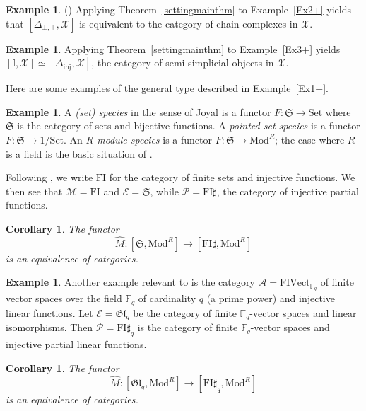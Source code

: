 \documentclass[a4paper,12pt,reqno]{amsart}
\newtheorem{corollary}[theorem]{Corollary}
\theoremstyle{definition}
\newtheorem{example}[theorem]{Example}
\theoremstyle{fact}
\theoremstyle{genquest}
\theoremstyle{step}
\newcommand{\lra}{\longrightarrow}
\def\CA{{\mathscr A}}
\def\CE{{\mathscr E}}
\def\CM{{\mathscr M}}
\def\CP{{\mathscr P}}
\def\CX{{\mathscr X}}
\begin{document}
\begin{example}\label{DPK} (\cite{Dold, DoldPuppe, Kan}) Applying Theorem~\ref{settingmainthm} to 
Example~\ref{Ex2+} yields that $[\Delta_{\bot,\top},\CX]$ is equivalent to 
the category of chain complexes in $\CX$.
\end{example}

\begin{example} 
Applying Theorem~\ref{settingmainthm} to Example~\ref{Ex3+} yields 
$[\mathbb{I},\CX] \simeq [\Delta_{\mathrm{inj}},\CX]$, the category of semi-simplicial objects in $\CX$.
\end{example}
\bigskip

Here are some examples of the general type described in Example~\ref{Ex1+}.
\bigskip

\begin{example} A {\em (set) species} in the sense of Joyal \cite{Species} is a functor 
$F : \mathfrak{S} \lra \mathrm{Set}$
where $\mathfrak{S}$ is the category of sets and bijective functions. 
A {\em pointed-set species} is a functor 
$F : \mathfrak{S} \lra 1/\mathrm{Set}$.
An {\em $R$-module species} is a functor 
$F : \mathfrak{S} \lra \mathrm{Mod}^R$; the case where $R$ is
a field is the basic situation of \cite{AnalFunct}.

Following \cite{CEF2012}, we write $\mathrm{FI}$ for the category of finite sets
and injective functions. We then see that 
$\CM = \mathrm{FI}$ and $\CE = \mathfrak{S}$,
while $\CP = \mathrm{FI}\sharp$, the category of injective partial functions.  

\begin{corollary} \cite{CEF2012} The functor
$$\widehat{M} : [\mathfrak{S}, \mathrm{Mod}^R] \lra [\mathrm{FI}\sharp, \mathrm{Mod}^R]$$
is an equivalence of categories.
\end{corollary}
\end{example}

\begin{example}
Another example relevant to \cite{repfgl} is the category $\CA = \mathrm{FIVect}_{\mathbb{F}_q}$
of finite vector spaces over the field $\mathbb{F}_q$ of cardinality 
$q$ (a prime power) and injective linear functions.
Let $\CE = \mathfrak{Gl}_q$ be the category of finite
$\mathbb{F}_q$-vector spaces and linear isomorphisms. 
Then $\CP = \mathrm{FI}\sharp_q$ is the
category of finite $\mathbb{F}_q$-vector spaces and injective 
partial linear functions.

\begin{corollary} The functor
$$\widehat{M} : [\mathfrak{Gl}_q, \mathrm{Mod}^R] \lra [\mathrm{FI}\sharp_q, \mathrm{Mod}^R]$$
is an equivalence of categories.
\end{corollary}
\end{example}   
\end{document}
